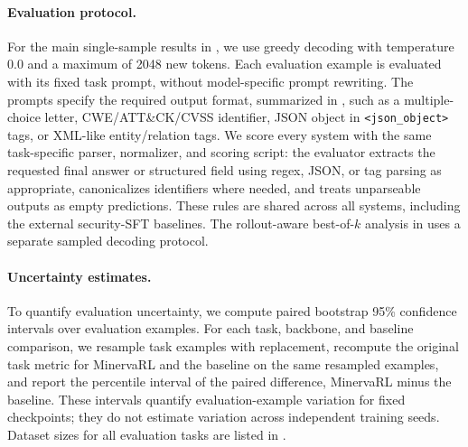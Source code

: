 \paragraph{Evaluation protocol.}
For the main single-sample results in , we use greedy decoding with temperature $0.0$ and a maximum of 2048 new tokens. Each evaluation example is evaluated with its fixed task prompt, without model-specific prompt rewriting. The prompts specify the required output format, summarized in , such as a multiple-choice letter, CWE/ATT\&CK/CVSS identifier, JSON object in \texttt{<json\_object>} tags, or XML-like entity/relation tags. We score every system with the same task-specific parser, normalizer, and scoring script: the evaluator extracts the requested final answer or structured field using regex, JSON, or tag parsing as appropriate, canonicalizes identifiers where needed, and treats unparseable outputs as empty predictions. These rules are shared across all systems, including the external security-SFT baselines. The rollout-aware best-of-$k$ analysis in  uses a separate sampled decoding protocol.

\paragraph{Uncertainty estimates.}
To quantify evaluation uncertainty, we compute paired bootstrap 95\% confidence intervals over evaluation examples. For each task, backbone, and baseline comparison, we resample task examples with replacement, recompute the original task metric for MinervaRL and the baseline on the same resampled examples, and report the percentile interval of the paired difference, MinervaRL minus the baseline. These intervals quantify evaluation-example variation for fixed checkpoints; they do not estimate variation across independent training seeds. Dataset sizes for all evaluation tasks are listed in .
